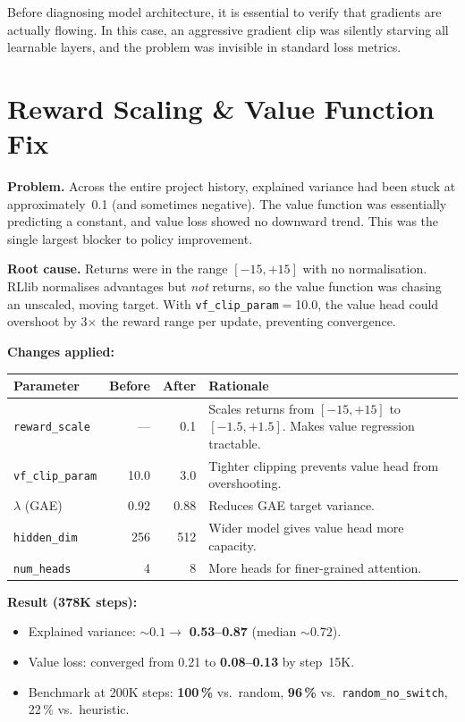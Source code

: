 \begin{keyinsight}
Before diagnosing model architecture, it is essential to verify that gradients
are actually flowing.  In this case, an aggressive gradient clip was silently
starving all learnable layers, and the problem was invisible in standard loss
metrics.
\end{keyinsight}

\section{Reward Scaling \& Value Function Fix}
\label{sec:reward_scaling}

\textbf{Problem.} Across the entire project history, explained variance had
been stuck at approximately~0.1 (and sometimes negative).  The value function
was essentially predicting a constant, and value loss showed no downward trend.
This was the single largest blocker to policy improvement.

\textbf{Root cause.} Returns were in the range $[-15, +15]$ with no
normalisation.  RLlib normalises advantages but \emph{not} returns, so the
value function was chasing an unscaled, moving target.  With
\texttt{vf\_clip\_param}$=$10.0, the value head could overshoot by 3$\times$
the reward range per update, preventing convergence.

\textbf{Changes applied:}

\begin{center}
\small
\begin{tabularx}{\textwidth}{l r r X}
  \toprule
  \textbf{Parameter} & \textbf{Before} & \textbf{After} & \textbf{Rationale} \\
  \midrule
  \texttt{reward\_scale} & --- & 0.1 &
    Scales returns from $[-15,+15]$ to $[-1.5,+1.5]$.  Makes value
    regression tractable. \\
  \texttt{vf\_clip\_param} & 10.0 & 3.0 &
    Tighter clipping prevents value head from overshooting. \\
  $\lambda$ (GAE) & 0.92 & 0.88 &
    Reduces GAE target variance. \\
  \texttt{hidden\_dim} & 256 & 512 &
    Wider model gives value head more capacity. \\
  \texttt{num\_heads} & 4 & 8 &
    More heads for finer-grained attention. \\
  \bottomrule
\end{tabularx}
\end{center}

\textbf{Result (378K steps):}
\begin{itemize}
  \item Explained variance: ${\sim}0.1 \to$ \textbf{0.53--0.87} (median
        ${\sim}0.72$).
  \item Value loss: converged from 0.21 to \textbf{0.08--0.13} by
        step~15K.
  \item Benchmark at 200K steps: \textbf{100\,\%} vs.\ random, \textbf{96\,\%}
        vs.\ \texttt{random\_no\_switch}, 22\,\% vs.\ heuristic.
\end{itemize}

